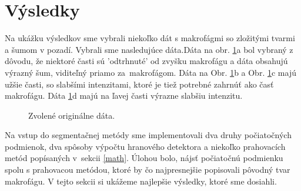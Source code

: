 \documentclass[a4paper,11pt,oneside]{article}%
\begin{document}
\newpage
\section{Výsledky}

Na ukážku výsledkov sme vybrali niekoľko dát s makrofágmi so zložitými tvarmi a šumom v pozadí. Vybrali sme nasledujúce dáta.Dáta na obr. \ref{fig:ogData}a bol vybraný z dôvodu, že niektoré časti sú 'odtrhnuté' od zvyšku makrofágu a dáta obsahujú výrazný šum, viditeľný priamo za~makrofágom. Dáta na Obr. \ref{fig:ogData}b a Obr. \ref{fig:ogData}c majú užšie časti, so slabšími intenzitami, ktoré je tiež potrebné zahrnúť ako časť makrofágu. Dáta \ref{fig:ogData}d majú na ľavej časti výrazne slabšiu intenzitu.

\begin{figure}[h!]  
    \hspace{5px}
    \hspace{5px}
    \hspace{5px}
    \caption{Zvolené originálne dáta.}
    \label{fig:ogData}
\end{figure}

Na vstup do segmentačnej metódy sme implementovali dva druhy počiatočných podmienok, dva spôsoby výpočtu hranového detektora a niekoľko prahovacích metód popísaných v~sekcii \ref{math}. Úlohou bolo, nájsť počiatočnú podmienku spolu s prahovacou metódou, ktoré by čo najpresnejšie popisovali pôvodný tvar makrofágu. V tejto sekcii si ukážeme najlepšie výsledky, ktoré sme dosiahli.
\end{document}
